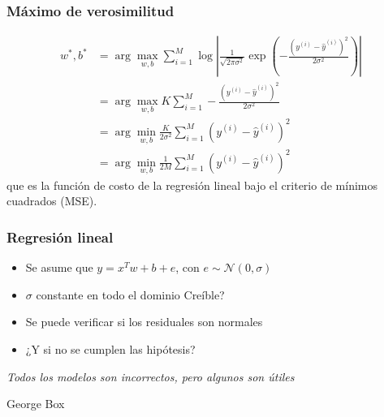 \documentclass{beamer}
\begin{document}
\begin{frame}
  \frametitle{Máximo de verosimilitud}
  \begin{align*}
    w^*, b^* &= \arg \max_{w, b} \sum_{i=1}^M \log\left| \frac{1}{\sqrt{2 \pi \sigma^2}} \exp \left( - \frac{(y^{(i)} - \hat{y}^{(i)})^2}{2 \sigma^2} \right)\right| \\
    &= \arg \max_{w, b} K \sum_{i=1}^M - \frac{(y^{(i)} - \hat{y}^{(i)})^2}{2 \sigma^2} \\
    &= \arg \min_{w, b} \frac{K}{2 \sigma^2} \sum_{i=1}^M (y^{(i)} - \hat{y}^{(i)})^2 \\
    &= \arg \min_{w, b} \frac{1}{2 M} \sum_{i=1}^M (y^{(i)} - \hat{y}^{(i)})^2
  \end{align*}
  que es la función de costo de la regresión lineal bajo el criterio de mínimos cuadrados (MSE).
\end{frame}

\begin{frame}
  \frametitle{Regresión lineal}

  \begin{itemize}
    \item Se asume que $y = x^T w + b + e$, con $e \sim \mathcal{N}(0, \sigma)$
    \item $\sigma$ constante en todo el dominio Creíble?
    \item Se puede verificar si los residuales son normales
    \item ¿Y si no se cumplen las hipótesis?
  \end{itemize}

  \begin{block}{}
    \emph{Todos los modelos son incorrectos, pero algunos son útiles} 
    
    \begin{flushright}
      George Box
    \end{flushright} 
  \end{block}
\end{frame}
\end{document}
